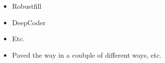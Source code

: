 \begin{itemize}
    \item Robustfill
    \item DeepCoder
    \item Etc.
    \item Paved the way in a coubple of different ways, etc.
\end{itemize}















    
    
    
    


        
